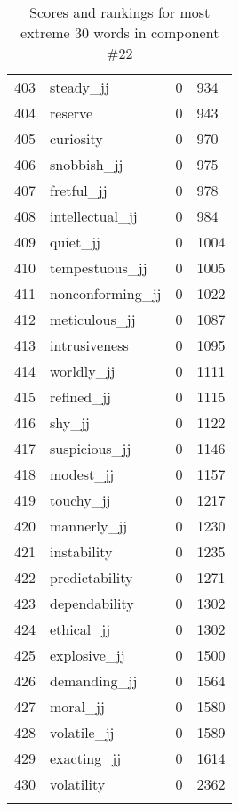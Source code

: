 \begin{longtable}[!htbp]{| rlr@{.}l |}
    403 & steady\_jj & 0 & 934 \\
    404 & reserve & 0 & 943 \\
    405 & curiosity & 0 & 970 \\
    406 & snobbish\_jj & 0 & 975 \\
    407 & fretful\_jj & 0 & 978 \\
    408 & intellectual\_jj & 0 & 984 \\
    409 & quiet\_jj & 0 & 1004 \\
    410 & tempestuous\_jj & 0 & 1005 \\
    411 & nonconforming\_jj & 0 & 1022 \\
    412 & meticulous\_jj & 0 & 1087 \\
    413 & intrusiveness & 0 & 1095 \\
    414 & worldly\_jj & 0 & 1111 \\
    415 & refined\_jj & 0 & 1115 \\
    416 & shy\_jj & 0 & 1122 \\
    417 & suspicious\_jj & 0 & 1146 \\
    418 & modest\_jj & 0 & 1157 \\
    419 & touchy\_jj & 0 & 1217 \\
    420 & mannerly\_jj & 0 & 1230 \\
    421 & instability & 0 & 1235 \\
    422 & predictability & 0 & 1271 \\
    423 & dependability & 0 & 1302 \\
    424 & ethical\_jj & 0 & 1302 \\
    425 & explosive\_jj & 0 & 1500 \\
    426 & demanding\_jj & 0 & 1564 \\
    427 & moral\_jj & 0 & 1580 \\
    428 & volatile\_jj & 0 & 1589 \\
    429 & exacting\_jj & 0 & 1614 \\
    430 & volatility & 0 & 2362 \\
    \hline
    \caption{Scores and rankings for most extreme 30 words in component \#22} \\
\end{longtable}

